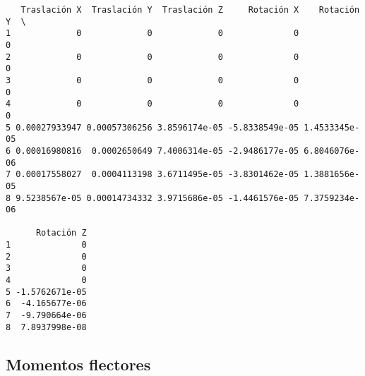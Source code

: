 \documentclass{article}
\begin{document}
    
    \begin{verbatim}
   Traslación X  Traslación Y  Traslación Z     Rotación X    Rotación Y  \
1             0             0             0              0             0   
2             0             0             0              0             0   
3             0             0             0              0             0   
4             0             0             0              0             0   
5 0.00027933947 0.00057306256 3.8596174e-05 -5.8338549e-05 1.4533345e-05   
6 0.00016980816  0.0002650649 7.4006314e-05 -2.9486177e-05 6.8046076e-06   
7 0.00017558027  0.0004113198 3.6711495e-05 -3.8301462e-05 1.3881656e-05   
8 9.5238567e-05 0.00014734332 3.9715686e-05 -1.4461576e-05 7.3759234e-06   

      Rotación Z  
1              0  
2              0  
3              0  
4              0  
5 -1.5762671e-05  
6  -4.165677e-06  
7  -9.790664e-06  
8  7.8937998e-08  
    \end{verbatim}

    
    \subsection{Momentos flectores}\label{momentos-flectores}
\end{document}
